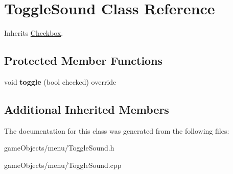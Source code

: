 \hypertarget{class_toggle_sound}{\section{Toggle\+Sound Class Reference}
\label{class_toggle_sound}
}


Inherits \hyperlink{class_checkbox}{Checkbox}.

\subsection*{Protected Member Functions}
\begin{DoxyCompactItemize}
\item 
\hypertarget{class_toggle_sound_a025f34ed217a54cd7e1a8d579a46e496}{void {\bfseries toggle} (bool checked) override}\label{class_toggle_sound_a025f34ed217a54cd7e1a8d579a46e496}

\end{DoxyCompactItemize}
\subsection*{Additional Inherited Members}


The documentation for this class was generated from the following files\+:\begin{DoxyCompactItemize}
\item 
game\+Objects/menu/Toggle\+Sound.\+h\item 
game\+Objects/menu/Toggle\+Sound.\+cpp\end{DoxyCompactItemize}
